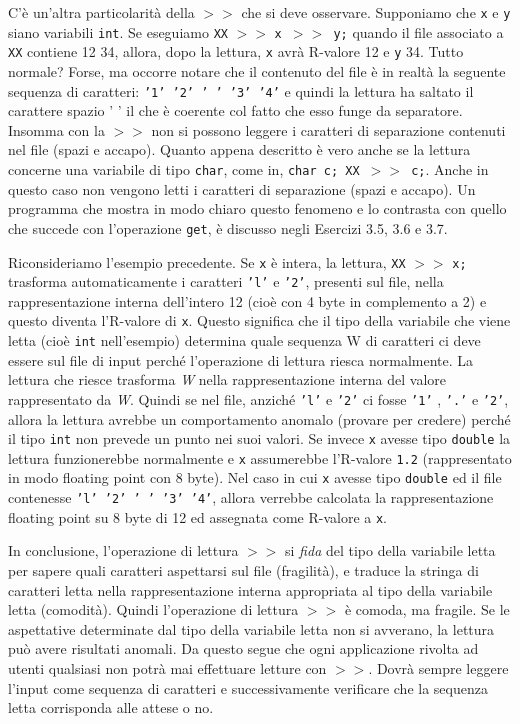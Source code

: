 \documentclass[a4paper,12pt]{book}
\begin{document}
\begin{itemize}
\noindent C'è un'altra particolarità della $>>$ che si deve osservare. Supponiamo che \texttt{x} e \texttt{y} siano variabili \texttt{int}. Se eseguiamo \texttt{XX} $>>$ \texttt{x $>>$ y;} quando il file associato a \texttt{XX} contiene 12 34, allora, dopo la lettura, \texttt{x} avrà R-valore 12 e \texttt{y} 34. Tutto normale? Forse, ma occorre notare che il contenuto del file è in realtà la seguente sequenza di caratteri: \texttt{'1' '2' ' ' '3' '4'} e quindi la lettura ha saltato il carattere spazio ' ' il che è coerente col fatto che esso funge da separatore. Insomma con la $>>$ non si possono leggere i caratteri di separazione contenuti nel file (spazi e accapo). Quanto appena descritto è vero anche se la lettura concerne una variabile di tipo \texttt{char}, come in, \texttt{char c; XX $>>$ c;}. Anche in questo caso non vengono letti i caratteri di separazione (spazi e accapo). Un programma che mostra in modo chiaro questo fenomeno e lo contrasta con quello che succede con l'operazione \texttt{get}, è discusso negli Esercizi 3.5, 3.6 e 3.7.

\noindent Riconsideriamo l'esempio precedente. Se \texttt{x} è intera, la lettura, \texttt{XX} $>>$ \texttt{x;} trasforma automaticamente i caratteri \texttt{'l'} e \texttt{'2'}, presenti sul file, nella rappresentazione interna dell'intero 12 (cioè con 4 byte in complemento a 2) e questo diventa l'R-valore di \texttt{x}. Questo significa che il tipo della variabile che viene letta (cioè \texttt{int} nell'esempio) determina quale sequenza W di caratteri ci deve essere sul file di input perché l'operazione di lettura riesca normalmente. La lettura che riesce trasforma \textit{W} nella rappresentazione interna del valore rappresentato da \textit{W}. Quindi se nel file, anziché \texttt{'l'} e \texttt{'2'} ci fosse \texttt{'1'} , \texttt{'.'} e \texttt{'2'}, allora la lettura avrebbe un comportamento anomalo (provare per credere) perché il tipo \texttt{int} non prevede un punto nei suoi valori. Se invece \texttt{x} avesse tipo \texttt{double} la lettura funzionerebbe normalmente e \texttt{x} assumerebbe l'R-valore \texttt{1.2} (rappresentato in modo floating point con 8 byte). Nel caso in cui \texttt{x} avesse tipo \texttt{double} ed il file contenesse \texttt{'l' '2' ' ' '3' '4'}, allora verrebbe calcolata la rappresentazione floating point su 8 byte di 12 ed assegnata come R-valore a \texttt{x}.

\noindent In conclusione, l'operazione di lettura $>>$ si \textit{fida} del tipo della variabile letta per sapere quali caratteri aspettarsi sul file (fragilità), e traduce la stringa di caratteri letta nella rappresentazione interna appropriata al tipo della variabile letta (comodità). Quindi l'operazione di lettura $>>$ è comoda, ma fragile. Se le aspettative determinate dal tipo della variabile letta non si avverano, la lettura può avere risultati anomali. Da questo segue che ogni applicazione rivolta ad utenti qualsiasi non potrà mai effettuare letture con $>>$. Dovrà sempre leggere l'input come sequenza di caratteri e successivamente verificare che la sequenza letta corrisponda alle attese o no.


\end{itemize}
\end{document}

